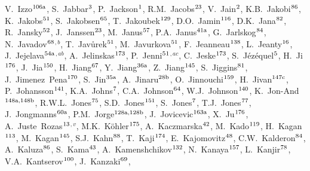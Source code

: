 \begin{flushleft}
V.~Izzo$^\textrm{\scriptsize 106a}$,
S.~Jabbar$^\textrm{\scriptsize 3}$,
P.~Jackson$^\textrm{\scriptsize 1}$,
R.M.~Jacobs$^\textrm{\scriptsize 23}$,
V.~Jain$^\textrm{\scriptsize 2}$,
K.B.~Jakobi$^\textrm{\scriptsize 86}$,
K.~Jakobs$^\textrm{\scriptsize 51}$,
S.~Jakobsen$^\textrm{\scriptsize 65}$,
T.~Jakoubek$^\textrm{\scriptsize 129}$,
D.O.~Jamin$^\textrm{\scriptsize 116}$,
D.K.~Jana$^\textrm{\scriptsize 82}$,
R.~Jansky$^\textrm{\scriptsize 52}$,
J.~Janssen$^\textrm{\scriptsize 23}$,
M.~Janus$^\textrm{\scriptsize 57}$,
P.A.~Janus$^\textrm{\scriptsize 41a}$,
G.~Jarlskog$^\textrm{\scriptsize 84}$,
N.~Javadov$^\textrm{\scriptsize 68}$$^{,b}$,
T.~Jav\r{u}rek$^\textrm{\scriptsize 51}$,
M.~Javurkova$^\textrm{\scriptsize 51}$,
F.~Jeanneau$^\textrm{\scriptsize 138}$,
L.~Jeanty$^\textrm{\scriptsize 16}$,
J.~Jejelava$^\textrm{\scriptsize 54a}$$^{,ab}$,
A.~Jelinskas$^\textrm{\scriptsize 173}$,
P.~Jenni$^\textrm{\scriptsize 51}$$^{,ac}$,
C.~Jeske$^\textrm{\scriptsize 173}$,
S.~J\'ez\'equel$^\textrm{\scriptsize 5}$,
H.~Ji$^\textrm{\scriptsize 176}$,
J.~Jia$^\textrm{\scriptsize 150}$,
H.~Jiang$^\textrm{\scriptsize 67}$,
Y.~Jiang$^\textrm{\scriptsize 36a}$,
Z.~Jiang$^\textrm{\scriptsize 145}$,
S.~Jiggins$^\textrm{\scriptsize 81}$,
J.~Jimenez~Pena$^\textrm{\scriptsize 170}$,
S.~Jin$^\textrm{\scriptsize 35a}$,
A.~Jinaru$^\textrm{\scriptsize 28b}$,
O.~Jinnouchi$^\textrm{\scriptsize 159}$,
H.~Jivan$^\textrm{\scriptsize 147c}$,
P.~Johansson$^\textrm{\scriptsize 141}$,
K.A.~Johns$^\textrm{\scriptsize 7}$,
C.A.~Johnson$^\textrm{\scriptsize 64}$,
W.J.~Johnson$^\textrm{\scriptsize 140}$,
K.~Jon-And$^\textrm{\scriptsize 148a,148b}$,
R.W.L.~Jones$^\textrm{\scriptsize 75}$,
S.D.~Jones$^\textrm{\scriptsize 151}$,
S.~Jones$^\textrm{\scriptsize 7}$,
T.J.~Jones$^\textrm{\scriptsize 77}$,
J.~Jongmanns$^\textrm{\scriptsize 60a}$,
P.M.~Jorge$^\textrm{\scriptsize 128a,128b}$,
J.~Jovicevic$^\textrm{\scriptsize 163a}$,
X.~Ju$^\textrm{\scriptsize 176}$,
A.~Juste~Rozas$^\textrm{\scriptsize 13}$$^{,v}$,
M.K.~K\"{o}hler$^\textrm{\scriptsize 175}$,
A.~Kaczmarska$^\textrm{\scriptsize 42}$,
M.~Kado$^\textrm{\scriptsize 119}$,
H.~Kagan$^\textrm{\scriptsize 113}$,
M.~Kagan$^\textrm{\scriptsize 145}$,
S.J.~Kahn$^\textrm{\scriptsize 88}$,
T.~Kaji$^\textrm{\scriptsize 174}$,
E.~Kajomovitz$^\textrm{\scriptsize 48}$,
C.W.~Kalderon$^\textrm{\scriptsize 84}$,
A.~Kaluza$^\textrm{\scriptsize 86}$,
S.~Kama$^\textrm{\scriptsize 43}$,
A.~Kamenshchikov$^\textrm{\scriptsize 132}$,
N.~Kanaya$^\textrm{\scriptsize 157}$,
L.~Kanjir$^\textrm{\scriptsize 78}$,
V.A.~Kantserov$^\textrm{\scriptsize 100}$,
J.~Kanzaki$^\textrm{\scriptsize 69}$,

\end{flushleft}
